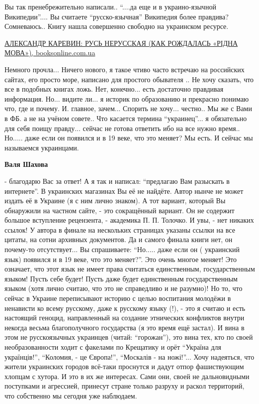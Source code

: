 \begin{itemize}
\begin{itemize}
\begin{itemize}
\end{itemize} %


Вы так пренебрежительно написали.. \enquote{....да еще и в украино-язычной
Википедии}.... Вы считаете \enquote{русско-язычная} Википедия более правдива?
Сомневаюсь.. Книгу нашла совершенно свободно на украинском
ресурсе. 

\href{https://booksonline.com.ua/view.php?book=54908}{
АЛЕКСАНДР КАРЕВИН: РУСЬ НЕРУССКАЯ (КАК РОЖДАЛАСЬ «РІДНА МОВА»), booksonline.com.ua%
}

Немного прочла... Ничего
нового, я такое чтиво часто встречаю на российских сайтах, его просто море,
написано для простого обывателя .. Не хочу сказать, что все в подобных книгах
ложь. Нет, конечно... есть достаточно правдивая информация. Но... видите ли... я
историк по образованию и прекрасно понимаю что, где и почему. И. главное,
зачем... Спорить не хочу... честно.. Мы же с Вами в ФБ. а не на учёном
совете.. Что касается термина \enquote{украинец}... я обязательно для себя поищу
правду... сейчас не готова ответить ибо на все нужно время.. Но..... даже если
он появился и в 19 веке, что это меняет? Мы есть. И сейчас мы называемся
украинцами.

\textbf{Валя Шахова} 

- благодарю Вас за ответ! А я так и написал: \enquote{предлагаю Вам разыскать в
интернете}. В украинских магазинах Вы её не найдёте. Автор нынче не может
издать её в Украине (я с ним лично знаком). А тот вариант, который Вы
обнаружили на частном сайте, - это сокращённый вариант. Он не содержит большое
вступление рецензента, - академика П. П. Толочко. И увы, - нет никаких ссылок! У
автора в финале на нескольких страницах указаны ссылки на все цитаты, на сотни
архивных документов. Да и самого финала книги нет, он почему-то отсутствует...
Вы спрашиваете: \enquote{Но..... даже если он ( украинский язык) появился и в 19 веке,
что это меняет?}. Это очень многое меняет! Это означает, что этот язык не имеет
права считаться единственным, государственным языком! Пусть себе будет! Пусть
даже будет единственным государственным языком (хотя лично считаю, что это не
справедливо и не разумно)! Но то, что сейчас в Украине переписывают историю с
целью воспитания молодёжи в ненависти ко всему русскому, даже к русскому языку
(!), - это я считаю и есть настоящий геноцид, направленный на создание
этнических конфликтов внутри некогда весьма благополучного государства (я это
время ещё застал). И вина в этом не русскоязычных украинцев (читай: \enquote{горожан}),
это вина тех, кто по своей необразованности ходит с факелами по Крещатику и
орёт \enquote{Україна для українців!}, \enquote{Коломия, - це Європа!}, \enquote{Москалів - на
ножі!}... Хочу надеяться, что жители украинских городов всё-таки проснутся и
дадут отпор фашиствующим хлопцам с хутора. И это в их же интересах. Сами они,
своей не дальновидными поступками и агрессией, принесут стране только разруху и
раскол территорий, что собственно мы сегодня уже наблюдаем.


\end{itemize}
\end{itemize}
